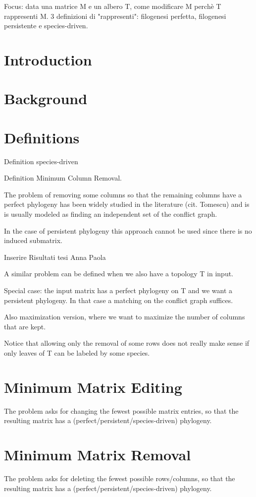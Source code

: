 Focus: data una matrice M e un albero T, come modificare M perchè T
rappresenti M.
3 definizioni di "rappresenti": filogenesi perfetta, filogenesi
persistente e species-driven.
 
 
\section{Introduction}
\section{Background}
\section{Definitions}

Definition species-driven

Definition Minimum Column Removal.

The problem of removing some columns so that the remaining columns have a perfect phylogeny has been widely studied in the literature (cit. Tomescu) and is is usually modeled as finding an independent set of the conflict graph.

In the case of persistent phylogeny this approach cannot be used since there is no induced submatrix.

Inserire Risultati tesi Anna Paola

A similar problem can be defined when we also have a topology T in input.

Special case: the input matrix has a perfect phylogeny on T and we want a persistent phylogeny. In that case a matching on the conflict graph suffices.

Also maximization version, where we want to maximize the number of columns that are kept.

Notice that allowing only the removal of some rows does not really make sense if only leaves of T can be labeled by some species.
\section{Minimum Matrix Editing}

The problem asks for changing the fewest possible matrix entries, so that the resulting matrix has a (perfect/persistent/species-driven) phylogeny.

\section{Minimum Matrix Removal}

The problem asks for deleting the fewest possible rows/columns, so that the resulting matrix has a (perfect/persistent/species-driven) phylogeny.

